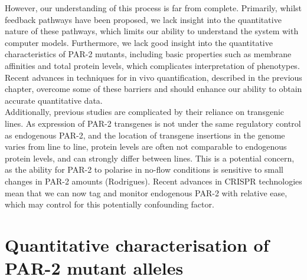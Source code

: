 \documentclass[12pt]{"report"}
\begin{document}
However, our understanding of this process is far from complete. Primarily, whilst feedback pathways have been proposed, we lack insight into the quantitative nature of these pathways, which limits our ability to understand the system with computer models. Furthermore, we lack good insight into the quantitative characteristics of PAR-2 mutants, including basic properties such as membrane affinities and total protein levels, which complicates interpretation of phenotypes. Recent advances in techniques for in vivo quantification, described in the previous chapter, overcome some of these barriers and should enhance our ability to obtain accurate quantitative data. \\

Additionally, previous studies are complicated by their reliance on transgenic lines. As expression of PAR-2 transgenes is not under the same regulatory control as endogenous PAR-2, and the location of transgene insertions in the genome varies from line to line, protein levels are often not comparable to endogenous protein levels, and can strongly differ between lines. This is a potential concern, as the ability for PAR-2 to polarise in no-flow conditions is sensitive to small changes in PAR-2 amounts (Rodrigues). Recent advances in CRISPR technologies mean that we can now tag and monitor endogenous PAR-2 with relative ease, which may control for this potentially confounding factor.\\


\section{Quantitative characterisation of PAR-2 mutant alleles}
\end{document}
